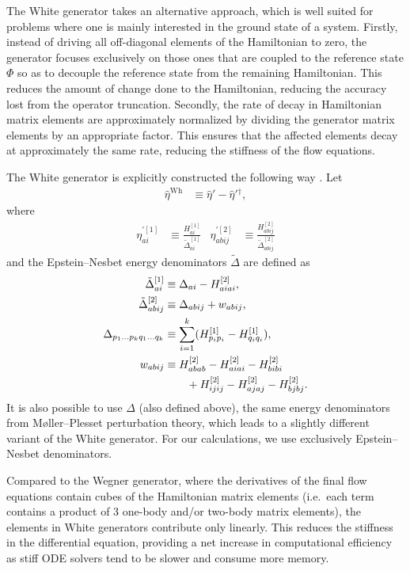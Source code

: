 The White generator takes an alternative approach, which is well suited for problems where one is mainly interested in the ground state of a system.  Firstly, instead of driving all off-diagonal elements of the Hamiltonian to zero, the generator focuses exclusively on those ones that are coupled to the reference state $\Phi$ so as to decouple the reference state from the remaining Hamiltonian.  This reduces the amount of change done to the Hamiltonian, reducing the accuracy lost from the operator truncation.  Secondly, the rate of decay in Hamiltonian matrix elements are approximately normalized by dividing the generator matrix elements by an appropriate factor.  This ensures that the affected elements decay at approximately the same rate, reducing the stiffness of the flow equations.

The White generator is explicitly constructed the following way \cite{PhysRevLett.106.222502,White:cond-mat0201346}.  Let
\begin{align*}
\hat{\eta}^{\text{Wh}} &\equiv \hat{\eta}' - \hat{\eta}'{}^\dagger,
\end{align*}
where
\begin{align*}
\eta^{\prime [1]}_{a i} &\equiv \frac{H^{[1]}_{a i}}{\tilde{\Delta}^{[1]}_{a i}} &
\eta^{\prime [2]}_{a b i j} &\equiv \frac{H^{[2]}_{a b i j}}{\tilde{\Delta}^{[2]}_{a b i j}}
\end{align*}
and the Epstein--Nesbet energy denominators $\tilde{\Delta}$ \cite{shavitt2009many} are defined as
\begin{align}
\tilde{\Delta}^{[1]}_{a i} &\equiv \Delta_{a i} - H^{[2]}_{a i a i}, \notag \\
\tilde{\Delta}^{[2]}_{a b i j} &\equiv \Delta_{a b i j} + w_{a b i j}, \notag \\
\Delta_{p_1 \ldots p_k q_1 \ldots q_k} &\equiv \sum_{i = 1}^k (H^{[1]}_{p_i p_i} -  H^{[1]}_{q_i q_i}), \label{eq:moellerplessetdenominator} \\
w_{a b i j}
  &\equiv H^{[2]}_{a b a b} - H^{[2]}_{a i a i} - H^{[2]}_{b i b i} \notag \\
  &\qquad + H^{[2]}_{i j i j} - H^{[2]}_{a j a j} - H^{[2]}_{b j b j}. \notag
\end{align}
It is also possible \cite{IMSRG} to use $\Delta$ (also defined above), the same energy denominators from M\o ller--Plesset perturbation theory, which leads to a slightly different variant of the White generator.  For our calculations, we use exclusively Epstein--Nesbet denominators.

Compared to the Wegner generator, where the derivatives of the final flow equations contain cubes of the Hamiltonian matrix elements (i.e.\ each term contains a product of 3 one-body and/or two-body matrix elements), the elements in White generators contribute only linearly.  This reduces the stiffness in the differential equation, providing a net increase in computational efficiency as stiff ODE solvers tend to be slower and consume more memory.

